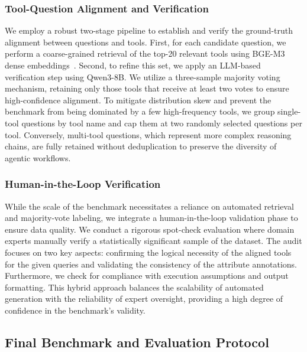 \documentclass[sigconf,nonacm]{acmart}
\begin{document}
\subsubsection{Tool-Question Alignment and Verification}
\label{subsec:alignment}

We employ a robust two-stage pipeline to establish and verify the ground-truth alignment between questions and tools.
First, for each candidate question, we perform a coarse-grained retrieval of the top-20 relevant tools using BGE-M3 dense embeddings~\cite{chen2024bge}.
Second, to refine this set, we apply an LLM-based verification step using Qwen3-8B. We utilize a three-sample majority voting mechanism, retaining only those tools that receive at least two votes to ensure high-confidence alignment.
To mitigate distribution skew and prevent the benchmark from being dominated by a few high-frequency tools, we group single-tool questions by tool name and cap them at two randomly selected questions per tool.
Conversely, multi-tool questions, which represent more complex reasoning chains, are fully retained without deduplication to preserve the diversity of agentic workflows.

\subsubsection{Human-in-the-Loop Verification}
\label{subsec:human_verification}

While the scale of the benchmark necessitates a reliance on automated retrieval and majority-vote labeling, we integrate a human-in-the-loop validation phase to ensure data quality.
We conduct a rigorous spot-check evaluation where domain experts manually verify a statistically significant sample of the dataset.
The audit focuses on two key aspects: confirming the logical necessity of the aligned tools for the given queries and validating the consistency of the attribute annotations.
Furthermore, we check for compliance with execution assumptions and output formatting.
This hybrid approach balances the scalability of automated generation with the reliability of expert oversight, providing a high degree of confidence in the benchmark's validity.


\subsection{Final Benchmark and Evaluation Protocol}
\label{subsec:final_benchmark}
\end{document}
